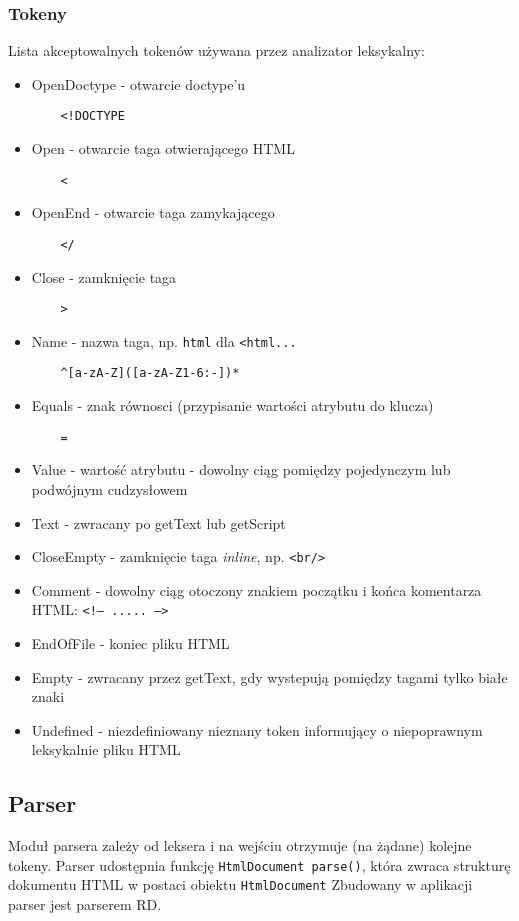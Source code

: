 \documentclass[11pt]{article}
\def\code#1{\texttt{#1}}
\begin{document}
\subsubsection{Tokeny}
Lista akceptowalnych tokenów używana przez analizator leksykalny:
\begin{itemize}
\item OpenDoctype - otwarcie doctype'u
	\begin{verbatim}
	<!DOCTYPE
	\end{verbatim}
\item Open - otwarcie taga otwierającego HTML
	\begin{verbatim}
	<
	\end{verbatim}
\item OpenEnd - otwarcie taga zamykającego
	\begin{verbatim}
	</
	\end{verbatim}
\item Close - zamknięcie taga
	\begin{verbatim}
	>
	\end{verbatim}
\item Name - nazwa taga, np. \code{html} dla \code{<html...}
	\begin{verbatim}
	^[a-zA-Z]([a-zA-Z1-6:-])*	
	\end{verbatim}
\item Equals - znak równosci (przypisanie wartości atrybutu do klucza)
	\begin{verbatim}
	=
	\end{verbatim}
\item Value - wartość atrybutu - dowolny ciąg pomiędzy pojedynczym lub podwójnym cudzysłowem
\item Text - zwracany po getText lub getScript
\item CloseEmpty - zamknięcie taga \textit{inline}, np. \code{<br/>}
\item Comment - dowolny ciąg otoczony znakiem początku i końca komentarza HTML: \code{<!-- ..... -->}
\item EndOfFile - koniec pliku HTML
\item Empty - zwracany przez getText, gdy wystepują pomiędzy tagami tylko białe znaki
\item Undefined - niezdefiniowany nieznany token informujący o niepoprawnym leksykalnie pliku HTML
\end{itemize}

\subsection{Parser}
Moduł parsera zależy od leksera i na wejściu otrzymuje (na żądane) kolejne tokeny.
Parser udostępnia funkcję \code{HtmlDocument parse()}, która zwraca strukturę dokumentu HTML w postaci obiektu \code{HtmlDocument} 
Zbudowany w aplikacji parser jest parserem RD.
\end{document}
